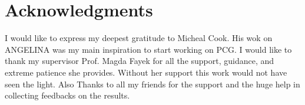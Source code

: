 \documentclass[letterpaper]{article}
\begin{document}
\section{Acknowledgments}
I would like to express my deepest gratitude to Micheal Cook. His wok on ANGELINA was my main inspiration to start working on PCG. I would like to thank my supervisor Prof. Magda Fayek for all the support, guidance, and extreme patience she provides. Without her support this work would not have seen the light. Also Thanks to all my friends for the support and the huge help in collecting feedbacks on the results.



\end{document}
